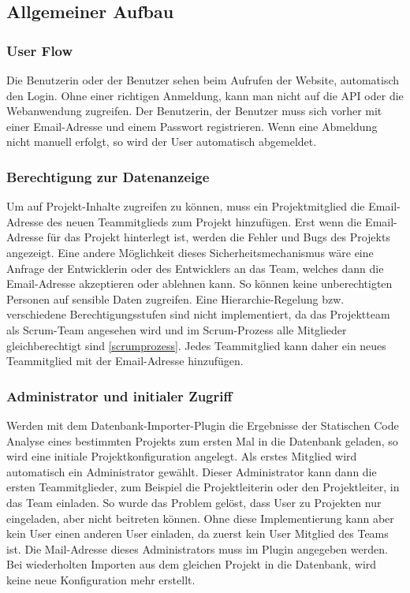 \subsection{Allgemeiner Aufbau} 
\subsubsection{User Flow}
Die Benutzerin oder der Benutzer sehen beim Aufrufen der Website, automatisch den Login. Ohne einer richtigen Anmeldung, kann man nicht auf die API oder die Webanwendung zugreifen. Der Benutzerin, der Benutzer muss sich vorher mit einer Email-Adresse und einem Passwort registrieren. Wenn eine Abmeldung nicht manuell erfolgt, so wird der User automatisch abgemeldet.
\subsubsection{Berechtigung zur Datenanzeige}
Um auf Projekt-Inhalte zugreifen zu können, muss ein Projektmitglied die Email-Adresse des neuen Teammitglieds zum Projekt hinzufügen. Erst wenn die Email-Adresse für das Projekt hinterlegt ist, werden die Fehler und Bugs des Projekts angezeigt. Eine andere Möglichkeit dieses Sicherheitsmechanismus wäre eine Anfrage der Entwicklerin oder des Entwicklers an das Team, welches dann die Email-Adresse akzeptieren oder ablehnen kann. So können keine unberechtigten Personen auf sensible Daten zugreifen. Eine Hierarchie-Regelung bzw. verschiedene Berechtigungsstufen sind nicht implementiert, da das Projektteam als Scrum-Team angesehen wird und im Scrum-Prozess alle Mitglieder gleichberechtigt sind \ref{scrumprozess}. Jedes Teammitglied kann daher ein neues Teammitglied mit der Email-Adresse hinzufügen.
\subsubsection{Administrator und initialer Zugriff}
Werden mit dem Datenbank-Importer-Plugin die Ergebnisse der Statischen Code Analyse eines bestimmten Projekts zum ersten Mal in die Datenbank geladen, so wird eine initiale Projektkonfiguration angelegt. Als erstes Mitglied wird automatisch ein Administrator gewählt. Dieser Administrator kann dann die ersten Teammitglieder, zum Beispiel die Projektleiterin oder den Projektleiter, in das Team einladen. So wurde das Problem gelöst, dass User zu Projekten nur eingeladen, aber nicht beitreten können. Ohne diese Implementierung kann aber kein User einen anderen User einladen, da zuerst kein User Mitglied des Teams ist. Die Mail-Adresse dieses Administrators muss im Plugin angegeben werden. Bei wiederholten Importen aus dem gleichen Projekt in die Datenbank, wird keine neue Konfiguration mehr erstellt.

